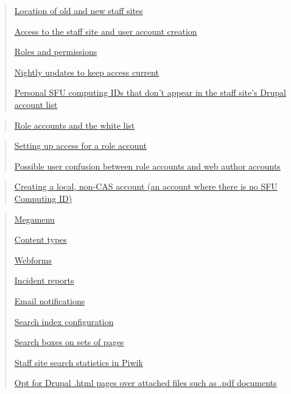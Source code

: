 \documentclass[
  openany]{book}
\begin{document}
\begin{quote}
\protect\hyperlink{location-of-old-and-new-staff-sites}{Location of old and new staff
sites}

\protect\hyperlink{access-to-the-staff-site-and-user-account-creation}{Access to the staff site and user account
creation}

\protect\hyperlink{roles-and-permissions}{Roles and permissions}

\protect\hyperlink{nightly-updates-to-keep-access-current}{Nightly updates to keep access
current}

\protect\hyperlink{personal-sfu-computing-ids-that-dont-appear-in-the-staff-sites-drupal-account-list}{Personal SFU computing IDs that don't appear in the staff site's
Drupal account
list}
\end{quote}

\begin{quote}
\protect\hyperlink{role-accounts-and-the-white-list}{Role accounts and the white list}
\end{quote}

\begin{quote}
\protect\hyperlink{setting-up-access-for-a-role-account}{Setting up access for a role
account}

\protect\hyperlink{possible-user-confusion-between-role-accounts-and-web-author-accounts}{Possible user confusion between role accounts and web author
accounts}
\end{quote}

\begin{quote}
\protect\hyperlink{creating-a-local-non-cas-account-an-account-where-there-is-no-sfu-computing-id}{Creating a local, non-CAS account (an account where there is no SFU
Computing
ID)}
\end{quote}

\begin{quote}
\protect\hyperlink{megamenu}{Megamenu}

\protect\hyperlink{content-types}{Content types}

\protect\hyperlink{webforms}{Webforms}

\protect\hyperlink{incident-reports}{Incident reports}

\protect\hyperlink{email-notifications}{Email notifications}

\protect\hyperlink{search-index-configuration}{Search index configuration}

\protect\hyperlink{search-boxes-on-sets-of-pages}{Search boxes on sets of pages}

\protect\hyperlink{staff-site-search-statistics-in-piwik}{Staff site search statistics in
Piwik}

\protect\hyperlink{opt-for-drupal-.html-pages-over-attached-files-such-as-.pdf-documents}{Opt for Drupal .html pages over attached files such as .pdf
documents}
\end{quote}
\end{document}
